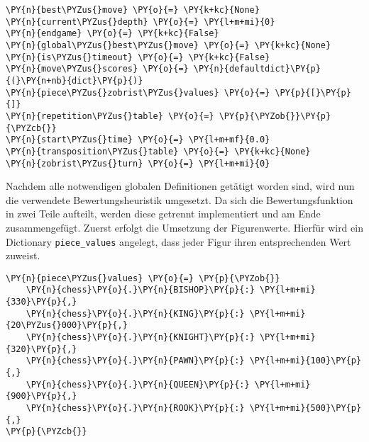     \begin{tcolorbox}[fontupper=\linespread{.66}\selectfont, breakable, size=fbox, boxrule=1pt, pad at break*=1mm,colback=cellbackground, colframe=cellborder]
\begin{Verbatim}[commandchars=\\\{\}]
\PY{n}{best\PYZus{}move} \PY{o}{=} \PY{k+kc}{None}
\PY{n}{current\PYZus{}depth} \PY{o}{=} \PY{l+m+mi}{0}
\PY{n}{endgame} \PY{o}{=} \PY{k+kc}{False}
\PY{n}{global\PYZus{}best\PYZus{}move} \PY{o}{=} \PY{k+kc}{None}
\PY{n}{is\PYZus{}timeout} \PY{o}{=} \PY{k+kc}{False}
\PY{n}{move\PYZus{}scores} \PY{o}{=} \PY{n}{defaultdict}\PY{p}{(}\PY{n+nb}{dict}\PY{p}{)}
\PY{n}{piece\PYZus{}zobrist\PYZus{}values} \PY{o}{=} \PY{p}{[}\PY{p}{]}
\PY{n}{repetition\PYZus{}table} \PY{o}{=} \PY{p}{\PYZob{}}\PY{p}{\PYZcb{}}
\PY{n}{start\PYZus{}time} \PY{o}{=} \PY{l+m+mf}{0.0}
\PY{n}{transposition\PYZus{}table} \PY{o}{=} \PY{k+kc}{None}
\PY{n}{zobrist\PYZus{}turn} \PY{o}{=} \PY{l+m+mi}{0}
\end{Verbatim}
\end{tcolorbox}

    Nachdem alle notwendigen globalen Definitionen getätigt worden sind,
wird nun die verwendete Bewertungsheuristik umgesetzt. Da sich die
Bewertungsfunktion in zwei Teile aufteilt, werden diese getrennt
implementiert und am Ende zusammengefügt. Zuerst erfolgt die Umsetzung
der Figurenwerte. Hierfür wird ein Dictionary \texttt{piece\_values}
angelegt, dass jeder Figur ihren entsprechenden Wert zuweist.

\bigskip

    \begin{tcolorbox}[fontupper=\linespread{.66}\selectfont, breakable, size=fbox, boxrule=1pt, pad at break*=1mm,colback=cellbackground, colframe=cellborder]
\begin{Verbatim}[commandchars=\\\{\}]
\PY{n}{piece\PYZus{}values} \PY{o}{=} \PY{p}{\PYZob{}}
    \PY{n}{chess}\PY{o}{.}\PY{n}{BISHOP}\PY{p}{:} \PY{l+m+mi}{330}\PY{p}{,}
    \PY{n}{chess}\PY{o}{.}\PY{n}{KING}\PY{p}{:} \PY{l+m+mi}{20\PYZus{}000}\PY{p}{,}
    \PY{n}{chess}\PY{o}{.}\PY{n}{KNIGHT}\PY{p}{:} \PY{l+m+mi}{320}\PY{p}{,}
    \PY{n}{chess}\PY{o}{.}\PY{n}{PAWN}\PY{p}{:} \PY{l+m+mi}{100}\PY{p}{,}
    \PY{n}{chess}\PY{o}{.}\PY{n}{QUEEN}\PY{p}{:} \PY{l+m+mi}{900}\PY{p}{,}
    \PY{n}{chess}\PY{o}{.}\PY{n}{ROOK}\PY{p}{:} \PY{l+m+mi}{500}\PY{p}{,}
\PY{p}{\PYZcb{}}
\end{Verbatim}
\end{tcolorbox}

